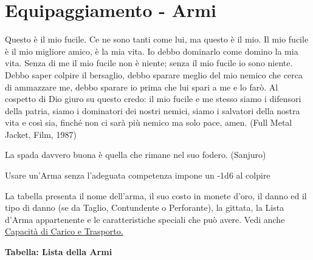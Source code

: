 \section{Equipaggiamento - Armi}\label{equipaggiamentoarmi}
\hypertarget{equipaggiamento.armi}{}

\label{equipaggiamento---armi}
\begin{enfasi}{
Questo è il mio fucile. Ce ne sono tanti come lui, ma questo è il mio. Il mio fucile è il mio migliore amico, è la mia vita. Io debbo dominarlo come domino la mia vita. Senza di me il mio fucile non è niente; senza il mio fucile io sono niente. Debbo saper colpire il bersaglio, debbo sparare meglio del mio nemico che cerca di ammazzare me, debbo sparare io prima che lui spari a me e lo farò. Al cospetto di Dio giuro su questo credo: il mio fucile e me stesso siamo i difensori della patria, siamo i dominatori dei nostri nemici, siamo i salvatori della nostra vita e così sia, finché non ci sarà più nemico ma solo pace, amen. (Full Metal Jacket, Film, 1987)

\medskip

La spada davvero buona è quella che rimane nel suo fodero. (Sanjuro)}\end{enfasi}

\medskip

Usare un'Arma senza l'adeguata competenza impone un -1d6 al colpire

La tabella presenta il nome dell'arma, il suo costo in monete d'oro, il danno ed il tipo di danno (se da Taglio, Contundente o Perforante), la gittata, la Lista d'Arma appartenente e le caratteristiche speciali che può avere. Vedi anche \hyperref[sec:capacita-di-carico-e-trasporto-ingombro]{Capacità di Carico e Trasporto.}

\medskip

\textbf{Tabella: Lista della Armi}

